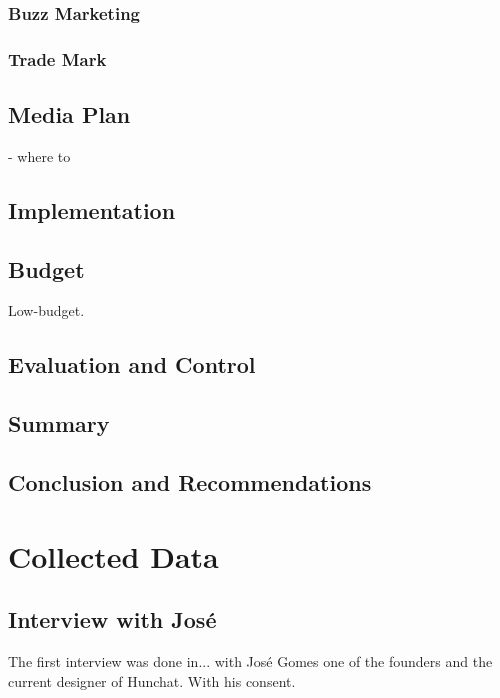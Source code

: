 \documentclass[12pt]{article}
\begin{document}
	\subsubsection{Buzz Marketing}
	\subsubsection{Trade Mark}
\subsection{Media Plan}
- where to

\subsection{Implementation}

\subsection{Budget}
Low-budget.

\subsection{Evaluation and Control}


\subsection{Summary}


\subsection{Conclusion and Recommendations}




\cleardoublepage
\newpage	

\printbibliography
\cleardoublepage

\appendix

\section{Collected Data}\label{data}
\subsection {Interview with José} \label{ze}
The first interview was done in... with José Gomes one of the founders and the current designer of Hunchat. With his consent.
\end{document}
